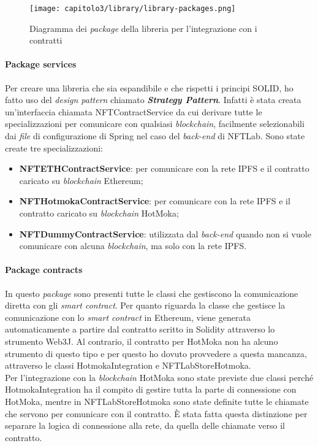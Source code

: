 \clearpage
\begin{figure}[h!]
  \centering
  \texttt{[image: capitolo3/library/library-packages.png]}
  \caption{Diagramma dei \textit{package} della libreria per l'integrazione con i contratti}
\end{figure}

\paragraph{Package services} Per creare una libreria che sia espandibile e che rispetti i principi SOLID, ho fatto uso del \textit{design pattern} chiamato \textit{\textbf{Strategy Pattern}}. Infatti è stata creata un'interfaccia chiamata NFTContractService da cui derivare tutte le specializzazioni per comunicare con qualsiasi \textit{blockchain}, facilmente selezionabili dai \textit{file} di configurazione di Spring nel caso del \textit{back-end} di NFTLab. Sono state create tre specializzazioni:
\begin{itemize}
  \item \textbf{NFTETHContractService}: per comunicare con la rete IPFS e il contratto caricato su \textit{blockchain} Ethereum;
  \item \textbf{NFTHotmokaContractService}: per comunicare con la rete IPFS e il contratto caricato su \textit{blockchain} HotMoka;
  \item \textbf{NFTDummyContractService}: utilizzata dal \textit{back-end} quando non si vuole comunicare con alcuna \textit{blockchain}, ma solo con la rete IPFS.
\end{itemize}

\paragraph{Package contracts} In questo \textit{package} sono presenti tutte le classi che gestiscono la comunicazione diretta con gli \textit{smart contract}. Per quanto riguarda la classe che gestisce la comunicazione con lo \textit{smart contract} in Ethereum, viene generata automaticamente a partire dal contratto scritto in Solidity attraverso lo strumento Web3J. Al contrario, il contratto per HotMoka non ha alcuno strumento di questo tipo e per questo ho dovuto provvedere a questa mancanza, attraverso le classi HotmokaIntegration e NFTLabStoreHotmoka. \\

Per l'integrazione con la \textit{blockchain} HotMoka sono state previste due classi perché HotmokaIntegration ha il compito di gestire tutta la parte di connessione con HotMoka, mentre in NFTLabStoreHotmoka sono state definite tutte le chiamate che servono per comunicare con il contratto. È stata fatta questa distinzione per separare la logica di connessione alla rete, da quella delle chiamate verso il contratto.

